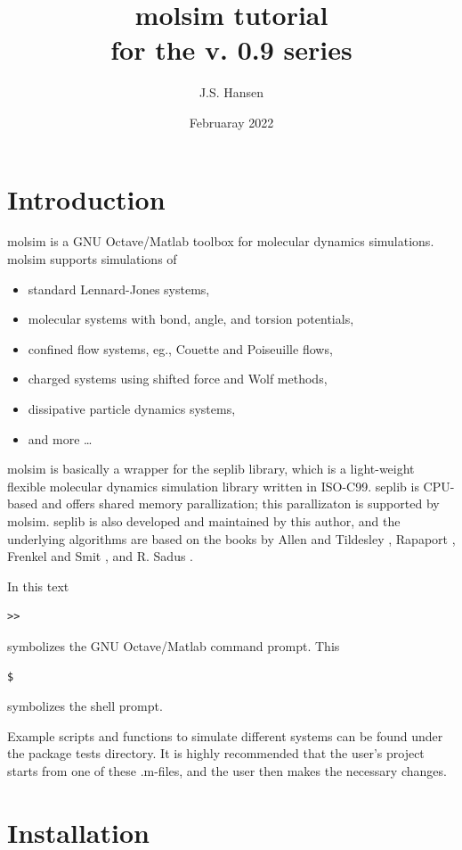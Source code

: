 \documentclass[11pt]{article}
\title{\textsf{molsim} tutorial \\ \bigskip \tiny{for the v. 0.9 series}}
\author{J.S. Hansen}
\date{Februaray 2022}
\begin{document}
\maketitle

\section{Introduction}

\textsf{molsim} is a GNU Octave/Matlab toolbox for molecular dynamics
simulations. \textsf{molsim} supports simulations of
\begin{itemize}
\item standard Lennard-Jones systems,
\item molecular systems with bond, angle, and torsion potentials, 
\item confined flow systems, eg., Couette and Poiseuille flows,
\item charged systems using shifted force and Wolf methods,
\item dissipative particle dynamics systems,
\item and more \ldots
\end{itemize}

\bigskip
\noindent \textsf{molsim} is basically a wrapper for the \textsf{seplib}
library, which is a light-weight flexible molecular dynamics simulation library
written in ISO-C99. \textsf{seplib} is CPU-based and offers shared memory
parallization; this parallizaton is supported by
\textsf{molsim}. \textsf{seplib} is also developed and maintained by this
author, and the underlying algorithms are based on the books by Allen and 
Tildesley \cite{AllenTildesley}, Rapaport \cite{Rapaport}, Frenkel and Smit
\cite{FrenkelSmit}, and R. Sadus \cite{Sadus}.

\bigskip
\noindent In this text
\begin{verbatim}
>> 
\end{verbatim}
symbolizes the GNU Octave/Matlab command prompt. This 
\begin{verbatim}
$ 
\end{verbatim}
symbolizes the shell prompt.

\bigskip
\noindent Example scripts and functions to simulate different systems can be
found under the package \textsf{tests} directory. It is highly recommended that
the user's project starts from one of these \textsf{.m}-files, and the user
then makes the necessary changes.  

\section{Installation}
\end{document}
